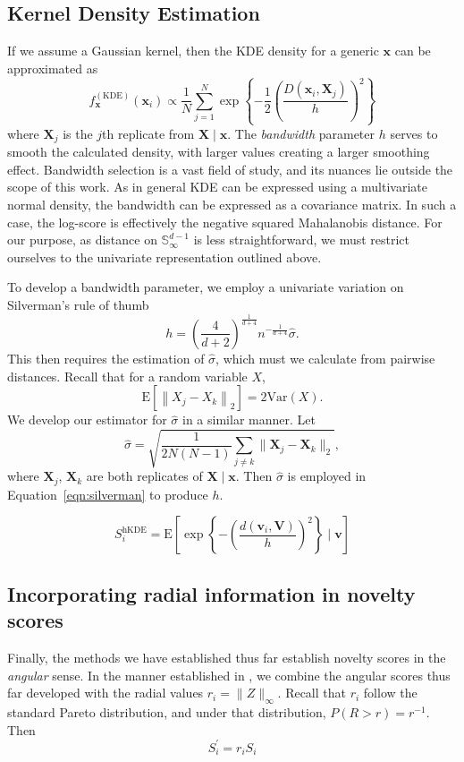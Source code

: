 \subsection{Kernel Density Estimation}

If we assume a Gaussian kernel, then the KDE density for a generic $\bm{x}$ can 
  be approximated as 
  \begin{equation}
    \label{eq:ad_kde}
    f_{\bm{x}}^{(\text{KDE})}(\bm{x}_i) \propto 
    \frac{1}{N}\sum_{j = 1}^{N}\exp
    \left\lbrace-\frac{1}{2}\left(\frac{D(\bm{x}_i,\bm{X}_j)}{h}\right)^2\right\rbrace
  \end{equation}
  where $\bm{X}_j$ is the $j$th 
  replicate from $\bm{X}\mid\bm{x}$.  The \emph{bandwidth} parameter $h$ serves to smooth
  the calculated density, with larger values creating a larger smoothing effect.
  Bandwidth selection is a vast field of study, and its nuances lie outside the
  scope of this work.  As in general KDE can be expressed using a multivariate normal density,
  the bandwidth can be expressed as a covariance matrix.  In such a case, the log-score
  is effectively the negative squared Mahalanobis distance.  For our purpose, as 
  distance on $\mathbb{S}_{\infty}^{d-1}$ is less straightforward, we must restrict 
  ourselves to the univariate representation outlined above.

To develop a bandwidth parameter, we employ a univariate variation on Silverman's 
  rule of thumb
  \begin{equation}
    \label{eqn:silverman}
    h = \left(\frac{4}{d+2}\right)^{\frac{1}{d+4}}n^{-\frac{1}{d+4}}\hat{\sigma}.
  \end{equation}
  This then requires the estimation of $\hat{\sigma}$, which must we calculate from 
  pairwise distances. Recall that for a random variable $X$, 
  \[ \text{E}\left[\left\lVert X_j - X_k\right\rVert_2\right] = 2\text{Var}(X). \]
  We develop our estimator for $\hat{\sigma}$ in a similar manner.  Let
  \[
    \hat{\sigma} = \sqrt{\frac{1}{2N(N-1)}\sum_{j\neq k}\lVert \bm{X}_j - \bm{X}_k\rVert_2},
  \]
  where $\bm{X}_j$, $\bm{X}_k$ are both replicates of $\bm{X}\mid\bm{x}$. Then 
  $\hat{\sigma}$ is employed in Equation~\ref{eqn:silverman} to produce $h$.
 
\begin{equation}
    \label{eqn:ad_kde_h}
    S_i^{\text{hKDE}} = \text{E}\left[\exp\left\lbrace -
    \left(\frac{d(\bm{v}_i,\bm{V})}{h}\right)^2\right\rbrace\mid\bm{v}\right]
\end{equation}

\subsection{Incorporating radial information in novelty scores}
Finally, the methods we have established thus far establish novelty scores in 
  the \emph{angular} sense.  In the manner established in \cite{goix2017}, we 
  combine the angular scores thus far developed with the radial values 
  $r_i = \lVert Z \rVert_{\infty}$.  Recall that $r_i$ follow the standard 
  Pareto distribution, and under that distribution, $P(R > r) = r^{-1}$.  Then
  \[
    S_i^{\prime} = r_iS_i
  \]

